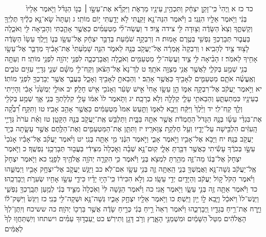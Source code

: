 \documentclass[twoside, openany, parskip=half, 11pt]{book}
\begin{document}
　　　כד כז א וַֽיְהִי֙ כִּֽי־זָקֵ֣ן יִצְחָ֔ק וַתִּכְהֶ֥יןָ עֵינָ֖יו מֵרְאֹ֑ת וַיִּקְרָ֞א אֶת־עֵשָׂ֣ו ׀ בְּנ֣וֹ הַגָּדֹ֗ל וַיֹּ֤אמֶר אֵלָיו֙ בְּנִ֔י וַיֹּ֥אמֶר אֵלָ֖יו הִנֵּֽנִי׃ ב וַיֹּ֕אמֶר הִנֵּה־נָ֖א זָקַ֑נְתִּי לֹ֥א יָדַ֖עְתִּי י֥וֹם מוֹתִֽי׃ ג וְעַתָּה֙ שָׂא־נָ֣א כֵלֶ֔יךָ תֶּלְיְךָ֖ וְקַשְׁתֶּ֑ךָ וְצֵא֙ הַשָּׂדֶ֔ה וְצ֥וּדָה לִּ֖י צידה צָֽיִד׃ ד וַעֲשֵׂה־לִ֨י מַטְעַמִּ֜ים כַּאֲשֶׁ֥ר אָהַ֛בְתִּי וְהָבִ֥יאָה לִּ֖י וְאֹכֵ֑לָה בַּעֲב֛וּר תְּבָרֶכְךָ֥ נַפְשִׁ֖י בְּטֶ֥רֶם אָמֽוּת׃ ה וְרִבְקָ֣ה שֹׁמַ֔עַת בְּדַבֵּ֣ר יִצְחָ֔ק אֶל־עֵשָׂ֖ו בְּנ֑וֹ וַיֵּ֤לֶךְ עֵשָׂו֙ הַשָּׂדֶ֔ה לָצ֥וּד צַ֖יִד לְהָבִֽיא׃ ו וְרִבְקָה֙ אָֽמְרָ֔ה אֶל־יַעֲקֹ֥ב בְּנָ֖הּ לֵאמֹ֑ר הִנֵּ֤ה שָׁמַ֙עְתִּי֙ אֶת־אָבִ֔יךָ מְדַבֵּ֛ר אֶל־עֵשָׂ֥ו אָחִ֖יךָ לֵאמֹֽר׃ ז הָבִ֨יאָה לִּ֥י צַ֛יִד וַעֲשֵׂה־לִ֥י מַטְעַמִּ֖ים וְאֹכֵ֑לָה וַאֲבָרֶכְכָ֛ה לִפְנֵ֥י יְהֹוָ֖ה לִפְנֵ֥י מוֹתִֽי׃ ח וְעַתָּ֥ה בְנִ֖י שְׁמַ֣ע בְּקֹלִ֑י לַאֲשֶׁ֥ר אֲנִ֖י מְצַוָּ֥ה אֹתָֽךְ׃ ט לֶךְ־נָא֙ אֶל־הַצֹּ֔אן וְקַֽח־לִ֣י מִשָּׁ֗ם שְׁנֵ֛י גְּדָיֵ֥י עִזִּ֖ים טֹבִ֑ים וְאֶֽעֱשֶׂ֨ה אֹתָ֧ם מַטְעַמִּ֛ים לְאָבִ֖יךָ כַּאֲשֶׁ֥ר אָהֵֽב׃ י וְהֵבֵאתָ֥ לְאָבִ֖יךָ וְאָכָ֑ל בַּעֲבֻ֛ר אֲשֶׁ֥ר יְבָרֶכְךָ֖ לִפְנֵ֥י מוֹתֽוֹ׃ יא וַיֹּ֣אמֶר יַעֲקֹ֔ב אֶל־רִבְקָ֖ה אִמּ֑וֹ הֵ֣ן עֵשָׂ֤ו אָחִי֙ אִ֣ישׁ שָׂעִ֔ר וְאָנֹכִ֖י אִ֥ישׁ חָלָֽק׃ יב אוּלַ֤י יְמֻשֵּׁ֙נִי֙ אָבִ֔י וְהָיִ֥יתִי בְעֵינָ֖יו כִּמְתַעְתֵּ֑עַ וְהֵבֵאתִ֥י עָלַ֛י קְלָלָ֖ה וְלֹ֥א בְרָכָֽה׃ יג וַתֹּ֤אמֶר לוֹ֙ אִמּ֔וֹ עָלַ֥י קִלְלָתְךָ֖ בְּנִ֑י אַ֛ךְ שְׁמַ֥ע בְּקֹלִ֖י וְלֵ֥ךְ קַֽח־לִֽי׃ יד וַיֵּ֙לֶךְ֙ וַיִּקַּ֔ח וַיָּבֵ֖א לְאִמּ֑וֹ וַתַּ֤עַשׂ אִמּוֹ֙ מַטְעַמִּ֔ים כַּאֲשֶׁ֖ר אָהֵ֥ב אָבִֽיו׃ טו וַתִּקַּ֣ח רִ֠בְקָ֠ה אֶת־בִּגְדֵ֨י עֵשָׂ֜ו בְּנָ֤הּ הַגָּדֹל֙ הַחֲמֻדֹ֔ת אֲשֶׁ֥ר אִתָּ֖הּ בַּבָּ֑יִת וַתַּלְבֵּ֥שׁ אֶֽת־יַעֲקֹ֖ב בְּנָ֥הּ הַקָּטָֽן׃ טז וְאֵ֗ת עֹרֹת֙ גְּדָיֵ֣י הָֽעִזִּ֔ים הִלְבִּ֖ישָׁה עַל־יָדָ֑יו וְעַ֖ל חֶלְקַ֥ת צַוָּארָֽיו׃ יז וַתִּתֵּ֧ן אֶת־הַמַּטְעַמִּ֛ים וְאֶת־הַלֶּ֖חֶם אֲשֶׁ֣ר עָשָׂ֑תָה בְּיַ֖ד יַעֲקֹ֥ב בְּנָֽהּ׃ יח וַיָּבֹ֥א אֶל־אָבִ֖יו וַיֹּ֣אמֶר אָבִ֑י וַיֹּ֣אמֶר הִנֶּ֔נִּי מִ֥י אַתָּ֖ה בְּנִֽי׃ יט וַיֹּ֨אמֶר יַעֲקֹ֜ב אֶל־אָבִ֗יו אָנֹכִי֙ עֵשָׂ֣ו בְּכֹרֶ֔ךָ עָשִׂ֕יתִי כַּאֲשֶׁ֥ר דִּבַּ֖רְתָּ אֵלָ֑י קֽוּם־נָ֣א שְׁבָ֗ה וְאׇכְלָה֙ מִצֵּידִ֔י בַּעֲב֖וּר תְּבָרְכַ֥נִּי נַפְשֶֽׁךָ׃ כ וַיֹּ֤אמֶר יִצְחָק֙ אֶל־בְּנ֔וֹ מַה־זֶּ֛ה מִהַ֥רְתָּ לִמְצֹ֖א בְּנִ֑י וַיֹּ֕אמֶר כִּ֥י הִקְרָ֛ה יְהֹוָ֥ה אֱלֹהֶ֖יךָ לְפָנָֽי׃ כא וַיֹּ֤אמֶר יִצְחָק֙ אֶֽל־יַעֲקֹ֔ב גְּשָׁה־נָּ֥א וַאֲמֻֽשְׁךָ֖ בְּנִ֑י הַֽאַתָּ֥ה זֶ֛ה בְּנִ֥י עֵשָׂ֖ו אִם־לֹֽא׃ כב וַיִּגַּ֧שׁ יַעֲקֹ֛ב אֶל־יִצְחָ֥ק אָבִ֖יו וַיְמֻשֵּׁ֑הוּ וַיֹּ֗אמֶר הַקֹּל֙ ק֣וֹל יַעֲקֹ֔ב וְהַיָּדַ֖יִם יְדֵ֥י עֵשָֽׂו׃ כג וְלֹ֣א הִכִּיר֔וֹ כִּֽי־הָי֣וּ יָדָ֗יו כִּידֵ֛י עֵשָׂ֥ו אָחִ֖יו שְׂעִרֹ֑ת וַֽיְבָרְכֵֽהוּ׃ כד וַיֹּ֕אמֶר אַתָּ֥ה זֶ֖ה בְּנִ֣י עֵשָׂ֑ו וַיֹּ֖אמֶר אָֽנִי׃ כה וַיֹּ֗אמֶר הַגִּ֤שָׁה לִּי֙ וְאֹֽכְלָה֙ מִצֵּ֣יד בְּנִ֔י לְמַ֥עַן תְּבָֽרֶכְךָ֖ נַפְשִׁ֑י וַיַּגֶּשׁ־לוֹ֙ וַיֹּאכַ֔ל וַיָּ֧בֵא ל֦וֹ יַ֖יִן וַיֵּֽשְׁתְּ׃ כו וַיֹּ֥אמֶר אֵלָ֖יו יִצְחָ֣ק אָבִ֑יו גְּשָׁה־נָּ֥א וּשְׁקָה־לִּ֖י בְּנִֽי׃ כז וַיִּגַּשׁ֙ וַיִּשַּׁק־ל֔וֹ וַיָּ֛רַח אֶת־רֵ֥יחַ בְּגָדָ֖יו וַֽיְבָרְכֵ֑הוּ וַיֹּ֗אמֶר רְאֵה֙ רֵ֣יחַ בְּנִ֔י כְּרֵ֣יחַ שָׂדֶ֔ה אֲשֶׁ֥ר בֵּרְכ֖וֹ יְהֹוָֽה׃ כה ששיכח וְיִֽתֶּן־לְךָ֙ הָאֱלֹהִ֔ים מִטַּל֙ הַשָּׁמַ֔יִם וּמִשְׁמַנֵּ֖י הָאָ֑רֶץ וְרֹ֥ב דָּגָ֖ן וְתִירֹֽשׁ׃ כט יַֽעַבְד֣וּךָ עַמִּ֗ים וישתחו וְיִֽשְׁתַּחֲו֤וּ לְךָ֙ לְאֻמִּ֔ים 
\end{document}
